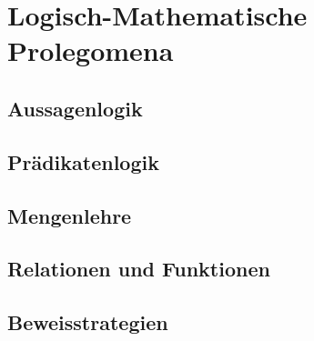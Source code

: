\chapter{Logisch-Mathematische Prolegomena}
\section{Aussagenlogik}
\section{Prädikatenlogik}
\section{Mengenlehre}
\section{Relationen und Funktionen}
\section{Beweisstrategien}
